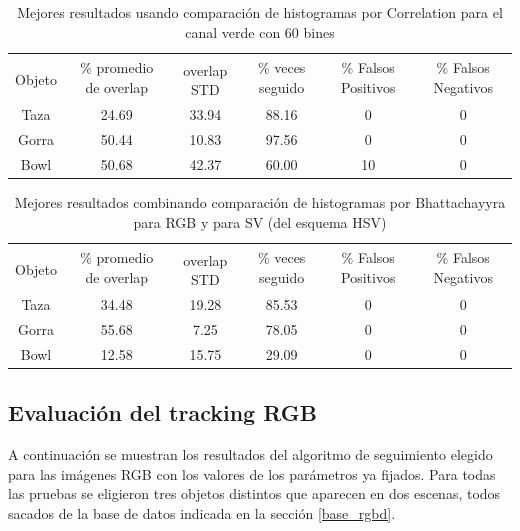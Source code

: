 \begin{table}[h]
	\begin{tabular}{|c|c|c|c|c|c|}
	    \hline
	    & \multirow{2}{2.4cm}{\% promedio de overlap} & & \multirow{2}{2cm}{\% veces seguido} & \multirow{2}{1.6cm}{\% Falsos Positivos} & \multirow{2}{1.6cm}{\% Falsos Negativos}\\
		Objeto & & overlap STD & & &\\
	    \hline
	    Taza   & 24.69      & 33.94       & 88.16             & 0                & 0\\
	    \hline
	    Gorra  & 50.44      & 10.83       & 97.56             & 0                & 0\\
	    \hline
	    Bowl   & 50.68      & 42.37       & 60.00             & 10               & 0\\
	    \hline
    \end{tabular}
	\caption{Mejores resultados usando comparación de histogramas por Correlation para el canal verde con 60 bines}
	\label{pruebas_definitivas_correl_green}
\end{table}

\begin{table}[h]
	\begin{tabular}{|c|c|c|c|c|c|}
	    \hline
	    & \multirow{2}{2.4cm}{\% promedio de overlap} & & \multirow{2}{2cm}{\% veces seguido} & \multirow{2}{1.6cm}{\% Falsos Positivos} & \multirow{2}{1.6cm}{\% Falsos Negativos}\\
		Objeto & & overlap STD & & &\\
	    \hline
	    Taza   & 34.48      & 19.28       & 85.53             & 0                & 0\\
	    \hline
	    Gorra  & 55.68      &  7.25       & 78.05             & 0                & 0\\
	    \hline
	    Bowl   & 12.58      & 15.75       & 29.09             & 0                & 0\\
	    \hline
    \end{tabular}
	\caption{Mejores resultados combinando comparación de histogramas por Bhattachayyra para RGB y para SV (del esquema HSV)}
	\label{pruebas_definitivas_rgb_sv}
\end{table}



\subsection{Evaluación del tracking RGB}\label{eval_rgb}
A continuación se muestran los resultados del algoritmo de seguimiento elegido para las imágenes RGB con los valores de los parámetros ya fijados. Para todas las pruebas se eligieron tres objetos distintos que aparecen en dos escenas, todos sacados de la base de datos indicada en la sección \ref{base_rgbd}.

